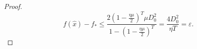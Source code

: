\documentclass{article} %
\numberwithin{equation}{section}
\begin{document}
\begin{proof}
    \begin{equation}
        f(\hat{x})-f_* \leq \frac{2(1-\frac{\eta\mu}{2})^T\mu D_0^2}{1-(1-\frac{\eta\mu}{2})^T}= \frac{4D_0^2}{\eta T}=\varepsilon.
    \end{equation}
\end{proof}
\end{document}
